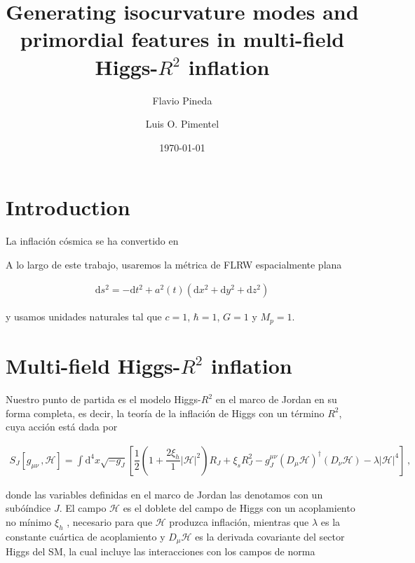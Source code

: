 \documentclass[12pt,a4paper,english,nofootinbib]{revtex4}
\newcommand{\dif}{\mathrm{d}}
\newcommand{\beq}{\begin{eqnarray}}
\newcommand{\enq}{\end{eqnarray}}
\begin{document}
\title{Generating isocurvature modes and primordial features in multi-field Higgs-$R^2$ inflation}
\author{Flavio Pineda}
\author{Luis O. Pimentel}
\date{\today}

\begin{abstract}
\lipsum[2]
\end{abstract}

\maketitle



\section{Introduction}

La inflación cósmica se ha convertido en \lipsum[1]

A lo largo de este trabajo, usaremos la métrica de FLRW espacialmente plana

\beq 
\dif s^2 = -\dif t^2 + a^2(t) (\dif x^2 + \dif y^2 + \dif z^2)
\label{FLRW metric}
\enq 

y usamos unidades naturales tal que $c = 1$, $\hbar = 1$, $G = 1$ y $M_p = 1$.

\section{Multi-field Higgs-$R^2$ inflation}

 Nuestro punto de partida es el modelo Higgs-$R^2$ \cite{EMA2017, GORBUNOV2019, GUNDHI2020} en el marco de Jordan en su forma completa, es decir, la teoría de la inflación de Higgs \cite{BEZRUKOV2008} con un término $R^2$, cuya acción está dada por

 \beq 
    S_J[g_{\mu\nu}\,,\mathcal{H}] = \int \dif^4 x \sqrt{-g_J}\left[ \dfrac{1}{2}\left(1 + \dfrac{2\xi_h}{1}|\mathcal{H}|^2 \right) R_J + \xi_s R_J^2 - g_J^{\mu\nu}(D_\mu \mathcal{H})^\dagger (D_\nu \mathcal{H}) -\lambda|\mathcal{H}|^4 \right]\,,
 \enq 


donde las variables definidas en el marco de Jordan las denotamos con un subóíndice $J$. El campo $\mathcal{H}$ es el doblete del campo de Higgs con un acoplamiento no mínimo $\xi_h$ , necesario para que $\mathcal{H}$ produzca inflación, mientras que $\lambda$ es la constante cuártica de acoplamiento y  $D_\mu\mathcal{H}$  es la derivada covariante del sector Higgs del SM, la cual incluye las interacciones con los campos de norma 
\end{document}

